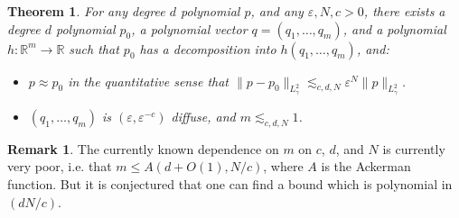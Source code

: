 \documentclass{article}
\theoremstyle{plain}
\newtheorem{theorem}{Theorem}
\theoremstyle{definition}
\newtheorem*{remark}{Remark}
\begin{document}
\begin{theorem}
    For any degree $d$ polynomial $p$, and any $\varepsilon,N,c > 0$, there exists a degree $d$ polynomial $p_0$, a polynomial vector $q = (q_1,\dots,q_m)$, and a polynomial $h: \mathbb{R}^m \to \mathbb{R}$ such that $p_0$ has a decomposition into $h(q_1,\dots,q_m)$, and:
    \begin{itemize}
        \item $p \approx p_0$ in the quantitative sense that $\| p - p_0 \|_{L^2_\gamma} \lesssim_{c,d,N} \varepsilon^N \| p \|_{L^2_\gamma}$.

        \item $(q_1,\dots,q_m)$ is $(\varepsilon,\varepsilon^{-c})$ diffuse, and $m \lesssim_{c,d,N} 1$.
    \end{itemize}
\end{theorem}

\begin{remark}
    The currently known dependence on $m$ on $c$, $d$, and $N$ is currently very poor, i.e. that $m \leq A(d + O(1), N/c)$, where $A$ is the Ackerman function. But it is conjectured that one can find a bound which is polynomial in $(dN/c)$.
\end{remark}
\end{document}
